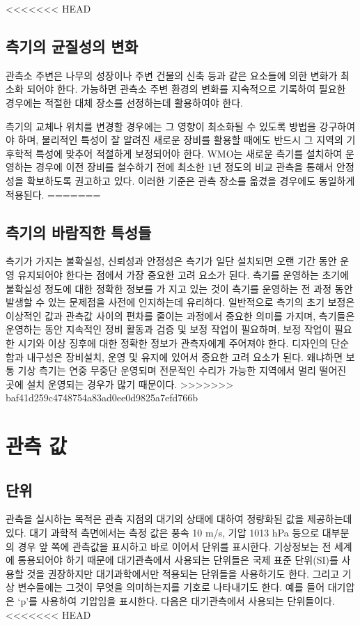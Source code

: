 \begin{itemize}
<<<<<<< HEAD
\subsection{측기의 균질성의 변화}
관측소 주변은 나무의 성장이나 주변 건물의 신축 등과 같은 요소들에 의한 변화가 최소화 되어야 한다. 가능하면 관측소 주변 환경의 변화를 지속적으로 기록하여 필요한 경우에는 적절한 대체 장소를 선정하는데 활용하여야 한다. 

측기의 교체나 위치를 변경할 경우에는 그 영향이 최소화될 수 있도록 방법을 강구하여야 하며, 물리적인 특성이 잘 알려진 새로운 장비를 활용할 때에도 반드시 그 지역의 기후학적 특성에 맞추어 적절하게 보정되어야 한다. WMO는 새로운 측기를 설치하여 운영하는 경우에 이전 장비를 철수하기 전에 최소한 1년 정도의 비교 관측을 통해서 안정성을 확보하도록 권고하고 있다. 이러한 기준은 관측 장소를 옮겼을 경우에도 동일하게 적용된다. 
=======
\subsection{측기의 바람직한 특성들}

측기가 가지는 불확실성, 신뢰성과 안정성은 측기가 일단 설치되면 오랜 기간 동안 운영 유지되어야 한다는 점에서 가장 중요한 고려 요소가 된다. 측기를 운영하는 초기에 불확실성 정도에 대한 정확한 정보를 가
지고 있는 것이 측기를 운영하는 전 과정 동안 발생할 수 있는 문제점을 사전에 인지하는데 유리하다.
일반적으로 측기의 초기 보정은 이상적인 값과 관측값 사이의 편차를 줄이는 과정에서 중요한 의미를 가지며, 측기들은 운영하는 동안 지속적인 정비 활동과 검증 및 보정 작업이 필요하며, 보정 작업이 필요한 시기와 이상 징후에 대한 정확한 정보가 관측자에게 주어져야 한다.
디자인의 단순함과 내구성은 장비설치, 운영 및 유지에 있어서 중요한 고려 요소가 된다. 왜냐하면 보통 기상 측기는 연중 무중단 운영되며 전문적인 수리가 가능한 지역에서 멀리 떨어진 곳에 설치 운영되는 경우가 많기 때문이다.
>>>>>>> baf41d259c4748754a83ad0ee0d9825a7efd766b

\section{관측 값}

\subsection{단위}

관측을 실시하는 목적은 관측 지점의 대기의 상태에 대하여 정량화된 값을 제공하는데 있다. 대기 과학적 측면에서는 측정 값은 풍속 10 m/s, 기압 1013 hPa 등으로 대부분의 경우 앞 쪽에 관측값을 표시하고 바로 이어서 단위를 표시한다.
기상정보는 전 세계에 통용되어야 하기 때문에 대기관측에서 사용되는 단위들은 국제 표준 단위(SI)를 사용할 것을 권장하지만 대기과학에서만 적용되는 단위들을 사용하기도 한다. 그리고 기상 변수들에는 그것이 무엇을 의미하는지를 기호로 나타내기도 한다. 예를 들어 대기압은 ‘p’를 사용하여 기압임을 표시한다. 다음은 대기관측에서 사용되는 단위들이다.
<<<<<<< HEAD


\end{itemize}
